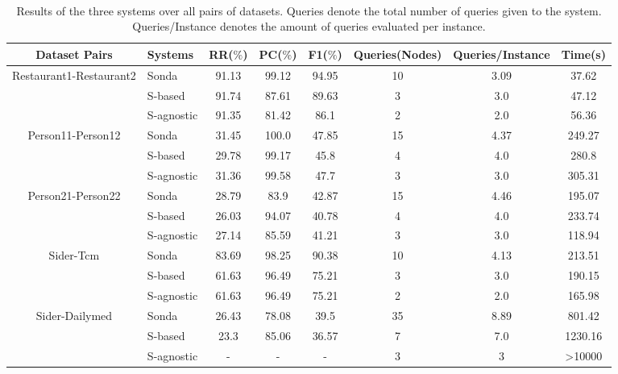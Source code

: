 \begin{table} 
\scriptsize\tt
\caption{Results of the three systems over all pairs of datasets. Queries denote the total number of queries given to the system. Queries/Instance denotes the amount of queries evaluated per instance.} 
    \begin{tabular}{|c|l|c|c|c|c|c|c|}
        \hline
        Dataset Pairs & Systems & RR($\%$) & PC($\%$) &  F1($\%$) & Queries(Nodes) & Queries/Instance & Time(s) \\ \hline
\multirow{3}{*}{Restaurant1-Restaurant2} & Sonda          & 91.13 & 99.12 & 94.95  & 10 & 3.09   & 37.62  \\
											& S-based & 91.74 & 87.61 & 89.63  & 3 & 3.0   & 47.12\\
 											& S-agnostic      & 91.35 & 81.42 & 86.1  & 2 & 2.0   & 56.36\\ \hline
 											
\multirow{3}{*}{Person11-Person12} & Sonda    & 31.45 & 100.0 & 47.85  & 15 & 4.37   & 249.27\\
											& S-based & 29.78 & 99.17 & 45.8  & 4 & 4.0   & 280.8\\
 											& S-agnostic      & 31.36 & 99.58 & 47.7  & 3 & 3.0   & 305.31\\ \hline

\multirow{3}{*}{Person21-Person22} & Sonda   & 28.79 & 83.9 & 42.87  & 15 & 4.46   & 195.07\\
											& S-based & 26.03 & 94.07 & 40.78  & 4 & 4.0   & 233.74\\
 											& S-agnostic       	& 27.14 & 85.59 & 41.21  & 3 & 3.0   & 118.94\\ \hline 										

 \multirow{3}{*}{Sider-Tcm} & Sonda          & 83.69 & 98.25 & 90.38  & 10 & 4.13   & 213.51  \\
											& S-based & 61.63 & 96.49 & 75.21  & 3 & 3.0   & 190.15\\
 											& S-agnostic        & 61.63 & 96.49 & 75.21  & 2 & 2.0   & 165.98\\ \hline
 											
\multirow{3}{*}{Sider-Dailymed} & Sonda     & 26.43 & 78.08 & 39.5  & 35 & 8.89   & 801.42 \\
											& S-based  & 23.3 & 85.06 & 36.57  & 7 & 7.0   & 1230.16\\
 											& S-agnostic     & - & - & -  & 3 & 3   & >10000   \\ \hline 		
 																							

\end{tabular}
\end{table}
